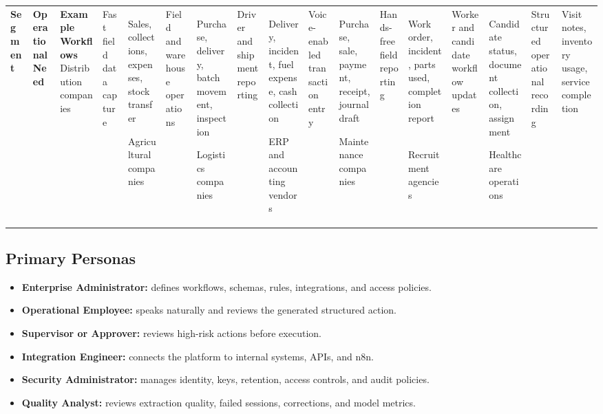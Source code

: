 \documentclass[11pt,a4paper]{article}
\begin{document}
\begin{tabularx}{\textwidth}{L{36mm}Y Y}
\toprule
\textbf{Segment} & \textbf{Operational Need} & \textbf{Example Workflows} \
\midrule
Distribution companies
& Fast field data capture
& Sales, collections, expenses, stock transfer \

Agricultural companies
& Field and warehouse operations
& Purchase, delivery, batch movement, inspection \

Logistics companies
& Driver and shipment reporting
& Delivery, incident, fuel expense, cash collection \

ERP and accounting vendors
& Voice-enabled transaction entry
& Purchase, sale, payment, receipt, journal draft \

Maintenance companies
& Hands-free field reporting
& Work order, incident, parts used, completion report \

Recruitment agencies
& Worker and candidate workflow updates
& Candidate status, document collection, assignment \

Healthcare operations
& Structured operational recording
& Visit notes, inventory usage, service completion \
\bottomrule
\end{tabularx}

\subsection{Primary Personas}

\begin{itemize}
\item \textbf{Enterprise Administrator:}
defines workflows, schemas, rules, integrations, and access policies.

\item \textbf{Operational Employee:}
speaks naturally and reviews the generated structured action.

\item \textbf{Supervisor or Approver:}
reviews high-risk actions before execution.

\item \textbf{Integration Engineer:}
connects the platform to internal systems, APIs, and n8n.

\item \textbf{Security Administrator:}
manages identity, keys, retention, access controls, and audit policies.

\item \textbf{Quality Analyst:}
reviews extraction quality, failed sessions, corrections, and model metrics.
\end{itemize}
\end{document}
